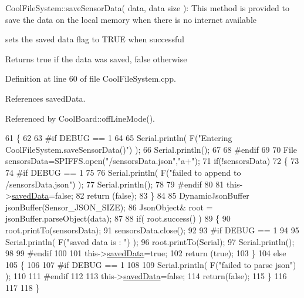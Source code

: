 Cool\+File\+System\+::save\+Sensor\+Data( data, data size )\+: This method is provided to save the data on the local memory when there is no internet available

sets the saved data flag to T\+R\+UE when successful

\begin{DoxyReturn}{Returns}
true if the data was saved, false otherwise 
\end{DoxyReturn}


Definition at line 60 of file Cool\+File\+System.\+cpp.



References saved\+Data.



Referenced by Cool\+Board\+::off\+Line\+Mode().


\begin{DoxyCode}
61 \{
62 
63 \textcolor{preprocessor}{#if DEBUG == 1}
64 
65     Serial.println( F(\textcolor{stringliteral}{"Entering CoolFileSystem.saveSensorData()"}) );
66     Serial.println();
67 
68 \textcolor{preprocessor}{#endif}
69     
70     File sensorsData=SPIFFS.open(\textcolor{stringliteral}{"/sensorsData.json"},\textcolor{stringliteral}{"a+"});
71     \textcolor{keywordflow}{if}(!sensorsData)
72     \{
73     
74 \textcolor{preprocessor}{    #if DEBUG == 1}
75     
76         Serial.println( F(\textcolor{stringliteral}{"failed to append to /sensorsData.json"}) );
77         Serial.println();
78     
79 \textcolor{preprocessor}{    #endif}
80 
81         this->\hyperlink{classCoolFileSystem_ad398e0c5c41a0c88acdf5d672aa71351}{savedData}=\textcolor{keyword}{false};
82         \textcolor{keywordflow}{return} (\textcolor{keyword}{false}); 
83     \}   
84 
85     DynamicJsonBuffer jsonBuffer(Sensor\_JSON\_SIZE);
86     JsonObject& root = jsonBuffer.parseObject(data);
87 
88     \textcolor{keywordflow}{if}( root.success() )
89     \{
90         root.printTo(sensorsData);
91         sensorsData.close();
92     
93 \textcolor{preprocessor}{    #if DEBUG == 1}
94     
95         Serial.println( F(\textcolor{stringliteral}{"saved data is : "}) );
96         root.printTo(Serial);
97         Serial.println();
98     
99 \textcolor{preprocessor}{    #endif}
100 
101         this->\hyperlink{classCoolFileSystem_ad398e0c5c41a0c88acdf5d672aa71351}{savedData}=\textcolor{keyword}{true};
102         \textcolor{keywordflow}{return} (\textcolor{keyword}{true});      
103     \}
104     \textcolor{keywordflow}{else}
105     \{
106     
107 \textcolor{preprocessor}{    #if DEBUG == 1}
108 
109         Serial.println( F(\textcolor{stringliteral}{"failed to parse json"}) );
110     
111 \textcolor{preprocessor}{    #endif}
112 
113         this->\hyperlink{classCoolFileSystem_ad398e0c5c41a0c88acdf5d672aa71351}{savedData}=\textcolor{keyword}{false};
114         \textcolor{keywordflow}{return}(\textcolor{keyword}{false});
115     \}
116     
117 
118 \}
\end{DoxyCode}
